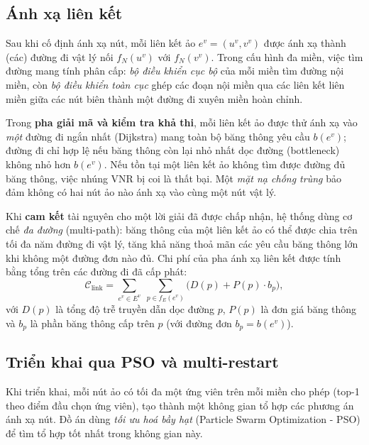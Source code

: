 \documentclass[../DoAn.tex]{subfiles}
\begin{document}
\subsection{Ánh xạ liên kết}
\label{subsec:cand-link}

Sau khi cố định ánh xạ nút, mỗi liên kết ảo $e^v=(u^v, v^v)$ được ánh xạ thành (các) đường đi vật lý nối $f_N(u^v)$ với $f_N(v^v)$. Trong cấu hình đa miền, việc tìm đường mang tính phân cấp: \textit{bộ điều khiển cục bộ} của mỗi miền tìm đường nội miền, còn \textit{bộ điều khiển toàn cục} ghép các đoạn nội miền qua các liên kết liên miền giữa các nút biên thành một đường đi xuyên miền hoàn chỉnh.

Trong \textbf{pha giải mã và kiểm tra khả thi}, mỗi liên kết ảo được thử ánh xạ vào \textit{một} đường đi ngắn nhất (Dijkstra) mang toàn bộ băng thông yêu cầu $b(e^v)$; đường đi chỉ hợp lệ nếu băng thông còn lại nhỏ nhất dọc đường (bottleneck) không nhỏ hơn $b(e^v)$. Nếu tồn tại một liên kết ảo không tìm được đường đủ băng thông, việc nhúng VNR bị coi là thất bại. Một \textit{mặt nạ chống trùng} bảo đảm không có hai nút ảo nào ánh xạ vào cùng một nút vật lý.

Khi \textbf{cam kết} tài nguyên cho một lời giải đã được chấp nhận, hệ thống dùng cơ chế \textit{đa đường} (multi-path): băng thông của một liên kết ảo có thể được chia trên tối đa năm đường đi vật lý, tăng khả năng thoả mãn các yêu cầu băng thông lớn khi không một đường đơn nào đủ. Chi phí của pha ánh xạ liên kết được tính bằng tổng trên các đường đi đã cấp phát:
\begin{equation}
\mathcal{C}_{\text{link}} = \sum_{e^v \in E^v}\; \sum_{p \in f_E(e^v)} \big( D(p) + P(p)\cdot b_p \big),
\label{eq:link-cost}
\end{equation}
với $D(p)$ là tổng độ trễ truyền dẫn dọc đường $p$, $P(p)$ là đơn giá băng thông và $b_p$ là phần băng thông cấp trên $p$ (với đường đơn $b_p=b(e^v)$).

\subsection{Triển khai qua PSO và multi-restart}
\label{subsec:cand-pso}

Khi triển khai, mỗi nút ảo có tối đa một ứng viên trên mỗi miền cho phép (top-1 theo điểm đầu chọn ứng viên), tạo thành một không gian tổ hợp các phương án ánh xạ nút. Đồ án dùng \textit{tối ưu hoá bầy hạt} (Particle Swarm Optimization - PSO) để tìm tổ hợp tốt nhất trong không gian này.
\end{document}
